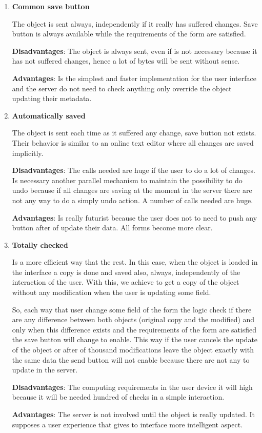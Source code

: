 \begin{enumerate}
\item \textbf{Common save button}

The object is sent always, independently if it really has suffered changes.
Save button is always available while the requirements of the form are satisfied.

\textbf{Disadvantages}:
The object is always sent, even if is not necessary because it has not suffered
changes, hence a lot of bytes will be sent without sense.

\textbf{Advantages}:
Is the simplest and faster implementation for the user interface and the server
do not need to check anything
only override the object updating their metadata.

\item \textbf{Automatically saved}

The object is sent each time as it suffered any change,
save button not exists. Their behavior is similar to an online text editor where
all changes are saved implicitly.

\textbf{Disadvantages}:
The calls needed are huge if the user to do a lot of changes. Is necessary another
parallel mechanism to maintain the possibility to do undo because if all changes
are saving at the moment in the server there are not any way to do a simply undo action.
A number of calls needed are huge.

\textbf{Advantages}:
Is really futurist because the user does not to need to push any button after of
update their data. All forms become more clear.

\item \textbf{Totally checked}

Is a more efficient way that the rest. In this case, when the object is loaded
in the interface a copy is done and
saved also, always, independently of the interaction of the user. With this, we
achieve to get a copy of the object without any modification when the user is updating some field.

So, each way that user change some field of the form the logic check if there are
any difference between both objects (original copy and the modified) and only
when this difference exists and the requirements of the form are satisfied the
save button will change to enable.
This way if the user cancels the update of the object or after of thousand
modifications leave the object exactly with the same data the send button will
not enable because there are not any to update in the server.

\textbf{Disadvantages}:
The computing requirements in the user device it will high because it will be
needed hundred of checks in a simple interaction.

\textbf{Advantages}:
The server is not involved until the object is really updated. It supposes a user
 experience that gives to interface more intelligent aspect.
\end{enumerate}

